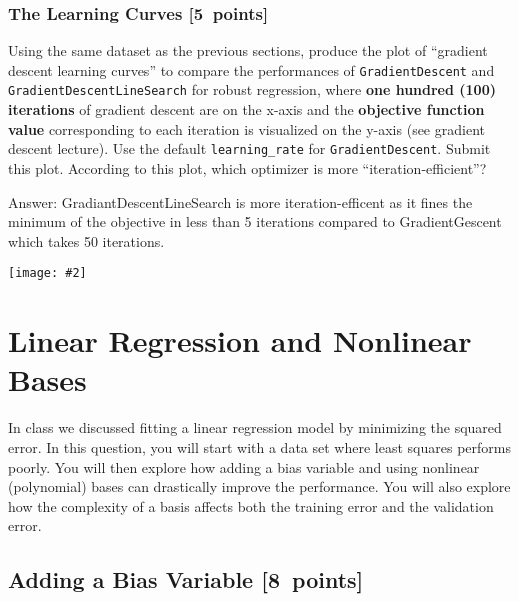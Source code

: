 \documentclass{article}
\newcommand{\blu}[1]{{\textcolor{blu}{#1}}}
\newcommand{\gre}[1]{\textcolor{gre}{#1}}
\newcommand\ans[1]{\par\gre{Answer: #1}}
\let\ask\blu
\newcommand\pts[1]{\textcolor{pointscolour}{[#1~points]}}
\newcommand{\centerfig}[2]{\begin{center}\texttt{[image: \#2]}\end{center}}
\begin{document}
\subsubsection{The Learning Curves \pts{5}}

Using the same dataset as the previous sections, produce the plot of ``gradient descent learning curves'' to compare the performances of \texttt{GradientDescent} and \texttt{GradientDescentLineSearch} for robust regression, where \textbf{one hundred (100) iterations} of gradient descent are on the x-axis and the \textbf{objective function value} corresponding to each iteration is visualized on the y-axis (see gradient descent lecture). Use the default \texttt{learning\_rate} for \texttt{GradientDescent}. \ask{Submit this plot. According to this plot, which optimizer is more ``iteration-efficient''?}
\ans{GradiantDescentLineSearch is more iteration-efficent as it fines the minimum of the objective in less than 5 iterations compared to GradientGescent which takes 50 iterations. }
\centerfig{.7}{./figs/learning_curves_robust_regression.pdf}


\clearpage
\section{Linear Regression and Nonlinear Bases}

In class we discussed fitting a linear regression model by minimizing the squared error.
In this question, you will start with a data set where least squares performs poorly.
You will then explore how adding a bias variable and using nonlinear (polynomial) bases can drastically improve the performance.
You will also explore how the complexity of a basis affects both the training error and the validation error.

\subsection{Adding a Bias Variable \pts{8}}
\end{document}
